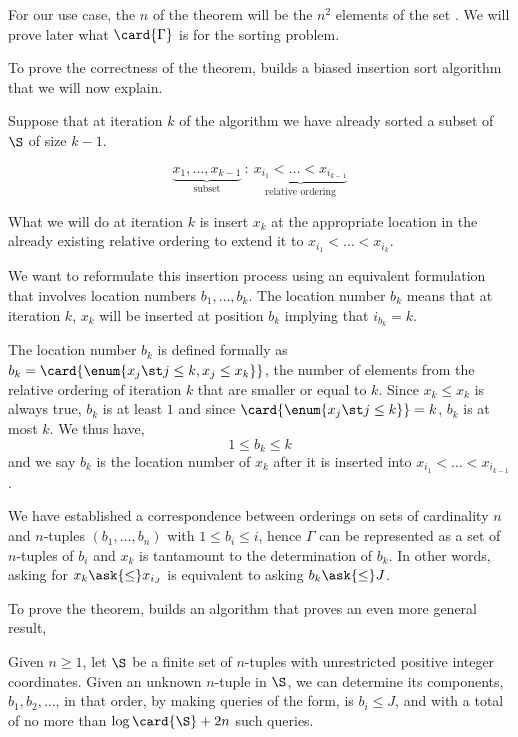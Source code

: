 For our use case, the $n$ of the theorem will be the $n^2$ elements of the set
\XY. We will prove later what $\card{\Gamma}$ is for the sorting \XY problem.

To prove the correctness of the theorem, \citet{fredman:1976} builds a biased
insertion sort algorithm that we will now explain.

Suppose that at iteration \(k\) of the algorithm we have already sorted a
subset of \(\S\) of size \(k-1\).

\begin{displaymath}
\underbrace{x_1, \ldots, x_{k-1}}_{\text{subset}}~:~\underbrace{x_{i_1} <
\ldots < x_{i_{k-1}}}_{\text{relative ordering}}
\end{displaymath}

What we will do at iteration $k$ is insert $x_k$ at the appropriate location
in the already existing relative ordering to extend it to $x_{i_1} < \ldots <
x_{i_k}$.

We want to reformulate this insertion process using an equivalent formulation
that involves location numbers $b_1, \ldots, b_k$. The location
number $b_k$ means that at iteration $k$, $x_k$ will be inserted at position
$b_k$ implying that $i_{b_k} = k$.

The location number $b_k$ is defined formally as $b_k = \card{\enum{x_j \st j
\le k, x_j \le x_k}}$, \ie the number of elements from the relative ordering
of iteration $k$ that are smaller or equal to $k$. Since $x_k \le x_k$ is
always true, $b_k$ is at least $1$ and since $\card{\enum{x_j \st j \le k}} =
k$, $b_k$ is at most $k$. We thus have,
$$ 1 \le b_k \le k$$
and we say $b_k$ is the location number of $x_k$ after it is inserted into
$x_{i_1} < \ldots < x_{i_{k-1}}$.

We have established a correspondence between orderings on sets of cardinality
$n$ and $n$-tuples $(b_1, \ldots, b_n)$ with $1 \le b_i \le i$, hence $\Gamma$
can be represented as a set of $n$-tuples of $b_i$ and $x_k$ is tantamount to
the determination of $b_k$. In other words, asking for $x_k \ask{\le} x_{i_J}$
is equivalent to asking $b_k \ask{\le} J$.

To prove the theorem, \citet{fredman:1976} builds an algorithm that proves an
even more general result,

\begin{lemma}
Given $n \ge 1$, let $\S$ be a finite set of $n$-tuples with unrestricted
positive integer coordinates. Given an unknown $n$-tuple in $\S$, we can
determine its components, $b_1, b_2, \ldots$, in that order, by making queries
of the form, is $b_i \le J$, and with a total of no more than $\log \card{\S}
+ 2n$ such queries.
\end{lemma}

